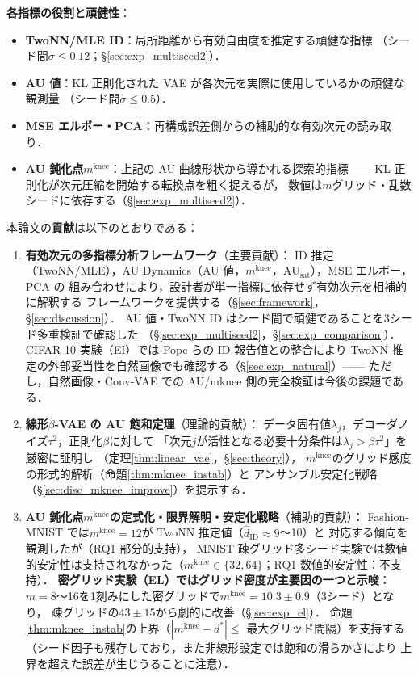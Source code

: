 \documentclass[11pt,a4paper]{jsarticle}
\newcommand{\AUsat}{\mathrm{AU}_{\mathrm{sat}}}
\newcommand{\mknee}{m^{\mathrm{knee}}}
\begin{document}
\textbf{各指標の役割と頑健性}：
\begin{itemize}
  \item \textbf{TwoNN/MLE ID}：局所距離から有効自由度を推定する頑健な指標
        （シード間$\sigma \leq 0.12$；§\ref{sec:exp_multiseed2}）．
  \item \textbf{AU 値}：KL 正則化された VAE が各次元を実際に使用しているかの頑健な観測量
        （シード間$\sigma \leq 0.5$）．
  \item \textbf{MSE エルボー・PCA}：再構成誤差側からの補助的な有効次元の読み取り．
  \item \textbf{AU 鈍化点$\mknee$}：上記の AU 曲線形状から導かれる探索的指標——
        KL 正則化が次元圧縮を開始する転換点を粗く捉えるが，
        数値は$m$グリッド・乱数シードに依存する（§\ref{sec:exp_multiseed2}）．
\end{itemize}

本論文の\textbf{貢献}は以下のとおりである：
\begin{enumerate}
  \item \textbf{有効次元の多指標分析フレームワーク}（主要貢献）：
        ID 推定（TwoNN/MLE），AU Dynamics（AU 値，$\mknee$，$\AUsat$），MSE エルボー，PCA の
        組み合わせにより，設計者が単一指標に依存せず有効次元を相補的に解釈する
        フレームワークを提供する（§\ref{sec:framework}，§\ref{sec:discussion}）．
        AU 値・TwoNN ID はシード間で頑健であることを3シード多重検証で確認した
        （§\ref{sec:exp_multiseed2}，§\ref{sec:exp_comparison}）．
        CIFAR-10 実験（EI）では Pope ら\cite{pope2021intrinsic}の ID 報告値との整合により
        TwoNN 推定の外部妥当性を自然画像でも確認する（§\ref{sec:exp_natural}）——
        ただし，自然画像・Conv-VAE での AU/mknee 側の完全検証は今後の課題である．
  \item \textbf{線形$\beta$-VAE の AU 飽和定理}（理論的貢献）：
        データ固有値$\lambda_j$，デコーダノイズ$\tau^2$，正則化$\beta$に対して
        「次元$j$が活性となる必要十分条件は$\lambda_j > \beta\tau^2$」を厳密に証明し
        （定理\ref{thm:linear_vae}，§\ref{sec:theory}），
        $\mknee$のグリッド感度の形式的解析（命題\ref{thm:mknee_instab}）と
        アンサンブル安定化戦略（§\ref{sec:disc_mknee_improve}）を提示する．
  \item \textbf{AU 鈍化点$\mknee$の定式化・限界解明・安定化戦略}（補助的貢献）：
        Fashion-MNIST では$\mknee = 12$が TwoNN 推定値（$\hat{d}_\mathrm{ID} \approx 9$〜10）と
        対応する傾向を観測したが（RQ1 部分的支持），
        MNIST 疎グリッド多シード実験では数値的安定性は支持されなかった（$\mknee \in \{32,64\}$；RQ1 数値的安定性：不支持）．
        \textbf{密グリッド実験（EL）ではグリッド密度が主要因の一つと示唆}：
        $m=8$〜16を1刻みにした密グリッドで$\mknee = 10.3 \pm 0.9$（3シード）となり，
        疎グリッドの$43 \pm 15$から劇的に改善（§\ref{sec:exp_el}）．
        命題\ref{thm:mknee_instab}の上界（$|\mknee - d^*| \leq$ 最大グリッド間隔）を支持する
        （シード因子も残存しており，また非線形設定では飽和の滑らかさにより
        上界を超えた誤差が生じうることに注意）．
\end{enumerate}
\end{document}
